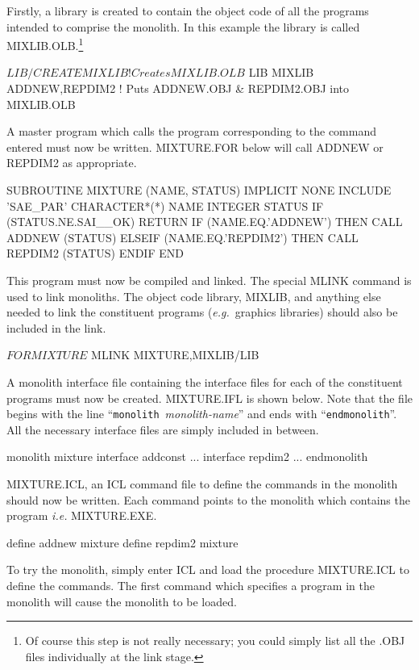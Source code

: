 \documentclass[twoside,11pt,nolof]{starlink}
\begin{document}
Firstly, a library is created  to contain the object code of
all the programs intended to comprise the monolith.
In this example  the library is called
MIXLIB.OLB.\footnote{Of course this step is not really necessary; you could simply
list all the .OBJ files individually at the link stage.}
\begin{terminalv}
$ LIB/CREATE MIXLIB           ! Creates MIXLIB.OLB
$ LIB MIXLIB ADDNEW,REPDIM2   ! Puts ADDNEW.OBJ & REPDIM2.OBJ into MIXLIB.OLB
\end{terminalv}
A master program which calls the program corresponding to the  command
entered must now be written. MIXTURE.FOR below will call ADDNEW or REPDIM2 as
appropriate.
\begin{terminalv}
      SUBROUTINE MIXTURE (NAME, STATUS)
      IMPLICIT NONE
      INCLUDE 'SAE_PAR'
      CHARACTER*(*) NAME
      INTEGER STATUS
      IF (STATUS.NE.SAI__OK) RETURN
      IF (NAME.EQ.'ADDNEW') THEN
         CALL ADDNEW (STATUS)
      ELSEIF (NAME.EQ.'REPDIM2') THEN
         CALL REPDIM2 (STATUS)
      ENDIF
      END
\end{terminalv}
This program must now be compiled and linked.
The special MLINK command is used to link monoliths.
The object code library, MIXLIB, and anything else
needed to link the constituent programs
(\textit{e.g.}\ graphics libraries) should also be included in the link.
\begin{terminalv}
$ FOR MIXTURE
$ MLINK MIXTURE,MIXLIB/LIB
\end{terminalv}
A monolith interface file containing the interface files for each of  the
constituent programs must now be created.
MIXTURE.IFL is shown below. Note that the file begins with the
line ``\texttt{monolith}~{\sl monolith-name}'' and ends with
``\texttt{endmonolith}''.
All the necessary interface files are simply included in between.
\begin{terminalv}
monolith mixture
  interface addconst
   ...
  interface repdim2
   ...
endmonolith
\end{terminalv}
MIXTURE.ICL, an ICL command file to define the commands in the monolith should
now be written. Each command points to the monolith which contains the
program \textit{i.e.} MIXTURE.EXE.
\begin{terminalv}
define addnew  mixture
define repdim2 mixture
\end{terminalv}
To try the monolith, simply
enter ICL and load the procedure MIXTURE.ICL to define the commands.
The first command which specifies a program in the monolith will cause the
monolith to be loaded.
\end{document}
